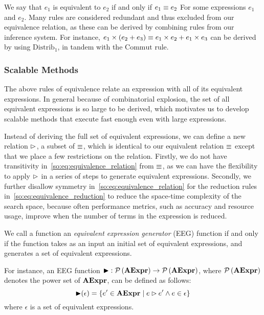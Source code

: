 We say that $e_1$ is equivalent to $e_2$ if and only if $e_1 \equiv e_2$ For
some expressions $e_1$ and $e_2$.  Many rules are considered redundant and thus
excluded from our equivalence relation, as these can be derived by combining
rules from our inference system.  For instance, $e_1 \times (e_2 + e_3) \equiv
e_1 \times e_2 + e_1 \times e_3$ can be derived by using $\mathrm{Distrib}_1$,
in tandem with the $\mathrm{Commut}$ rule.


\subsubsection{Scalable Methods}

The above rules of equivalence relate an expression with all of its equivalent
expressions.  In general because of combinatorial explosion, the set of all
equivalent expressions is so large to be derived, which motivates us to develop
scalable methods that execute fast enough even with large expressions.

Instead of deriving the full set of equivalent expressions, we can
define a new relation $\mathbin{\rhd}$, a subset of $\equiv$, which
is identical to our equivalent relation $\equiv$ except that we
place a few restrictions on the relation.  Firstly, we do not have
transitivity in~\eqref{so:eq:equivalence_relation} from $\equiv$, as
we can have the flexibility to apply $\mathbin{\rhd}$ in a series of steps
to generate equivalent expressions.  Secondly, we further disallow
symmetry in~\eqref{so:eq:equivalence_relation} for the reduction rules
in~\ref{so:eq:equivalence_reduction} to reduce the space-time complexity of the
search space, because often performance metrics, such as accuracy and resource
usage, improve when the number of terms in the expression is reduced.

\begin{definition}
    We call a function an \emph{equivalent expression generator} (EEG) function
if and only if the function takes as an input an initial set of equivalent
expressions, and generates a set of equivalent expressions.
\end{definition}

For instance, an EEG function $\operatorname{\blacktriangleright}: \mathcal{P}\left({\mathbf{AExpr}}\right) \to
\mathcal{P}\left({\mathbf{AExpr}}\right)$, where $\mathcal{P}\left({\mathbf{AExpr}}\right)$ denotes the power set of
$\mathbf{AExpr}$, can be defined as follows:
\begin{equation}
    \operatorname{\blacktriangleright}(\epsilon) = \left\{
        e^\prime\in\mathbf{AExpr} \mid
        e \mathbin{\rhd} e^\prime \wedge e\in\epsilon\right\}
    \label{so:eq:eqstep}
\end{equation}
where $\epsilon$ is a set of equivalent expressions.

